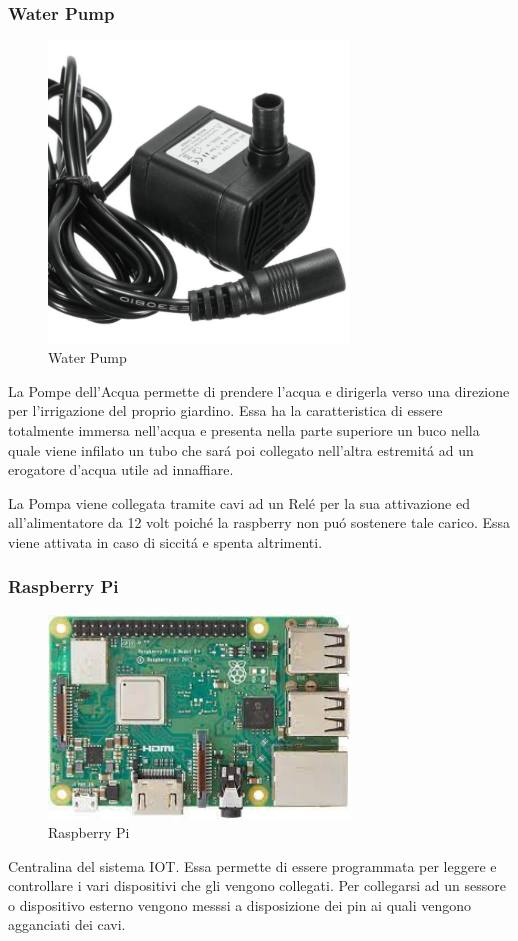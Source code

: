 \subsubsection{Water Pump}
\begin{figure}
    \centering
    \includegraphics[width=8cm]{Immagini/water_pump}
    \caption{Water Pump}
    \label{fig:water_pump}
\end{figure}
La Pompe dell'Acqua permette di prendere l'acqua e dirigerla verso una direzione per l'irrigazione del proprio giardino. Essa ha la caratteristica di essere totalmente immersa nell'acqua e presenta nella parte superiore un buco nella quale viene infilato un tubo che sar\'a poi collegato nell'altra estremit\'a ad un erogatore d'acqua utile ad innaffiare.

La Pompa viene collegata tramite cavi ad un Rel\'e per la sua attivazione ed all'alimentatore da 12 volt poiché la raspberry non pu\'o sostenere tale carico. Essa viene attivata in caso di siccit\'a e spenta altrimenti.

\subsubsection{Raspberry Pi}
\begin{figure}
    \centering
    \includegraphics[width=8cm]{Immagini/raspberry_pi}
    \caption{Raspberry Pi}
    \label{fig:raspberry_pi}
\end{figure}
Centralina del sistema IOT. Essa permette di essere programmata per leggere e controllare i vari dispositivi che gli vengono collegati. Per collegarsi ad un sessore o dispositivo esterno vengono messsi a disposizione dei pin ai quali vengono agganciati dei cavi.

